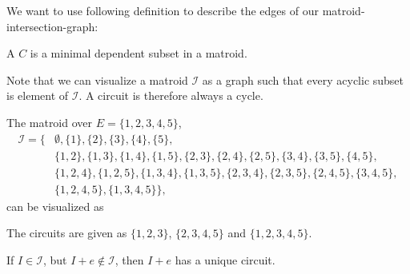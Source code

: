 We want to use following definition to describe the edges of our matroid-intersection-graph:
\begin{definition}[Circuit]
    A  $C$ is a minimal dependent subset in a matroid.
\end{definition}
Note that we can visualize a matroid $\mathcal I$ as a graph such that every acyclic subset is element of $\mathcal I$.
A circuit is therefore always a cycle.
\begin{example}
    The matroid over $E = \{1,2,3,4,5\}$,
    \begin{align*}
        \mathcal I = \{ &
        \emptyset,\{1\},\{2\},\{3\},\{4\},\{5\},                                                           \\
                        & \{1,2\},\{1,3\},\{1,4\},\{1,5\},\{2,3\},\{2,4\},\{2,5\},\{3,4\},\{3,5\},\{4,5\}, \\
                        & \{1,2,4\},\{1,2,5\},\{1,3,4\},\{1,3,5\},
        \{2,3,4\},\{2,3,5\},\{2,4,5\},\{3,4,5\},                                                           \\
                        & \{1,2,4,5\},\{1,3,4,5\}
        \},
    \end{align*}
    can be visualized as
    \\
    \begin{minipage}{\textwidth}
        \centering
    \end{minipage}
    The circuits are given as $\{1,2,3\}$, $\{2,3,4,5\}$ and $\{1,2,3,4,5\}$.
\end{example}
\begin{lemma}
    If $I \in \mathcal{I}$, but $I +e \not \in \mathcal{I}$, then $I+e$ has a unique circuit.
\end{lemma}
